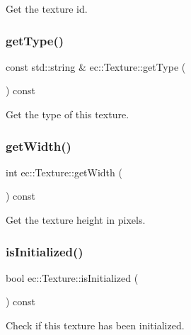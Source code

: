 Get the texture id. 

\mbox{\label{classec_1_1_texture_a1c33bc610c0b5c7807fa92897320349f}} 
\subsubsection{\texorpdfstring{get\+Type()}{getType()}}
{\footnotesize\ttfamily const std\+::string \& ec\+::\+Texture\+::get\+Type (\begin{DoxyParamCaption}{ }\end{DoxyParamCaption}) const}



Get the type of this texture. 

\mbox{\label{classec_1_1_texture_a0c01b293f7fe1b9ee863a1a2e9b64a6f}} 
\subsubsection{\texorpdfstring{get\+Width()}{getWidth()}}
{\footnotesize\ttfamily int ec\+::\+Texture\+::get\+Width (\begin{DoxyParamCaption}{ }\end{DoxyParamCaption}) const}



Get the texture height in pixels. 

\mbox{\label{classec_1_1_texture_ab81c62fde2f54dfbb5895a421224fcd9}} 
\subsubsection{\texorpdfstring{is\+Initialized()}{isInitialized()}}
{\footnotesize\ttfamily bool ec\+::\+Texture\+::is\+Initialized (\begin{DoxyParamCaption}{ }\end{DoxyParamCaption}) const}



Check if this texture has been initialized. 

